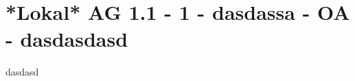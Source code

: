 \section{*Lokal* AG 1.1 - 1 - dasdassa - OA - dasdasdasd}

\begin{beispiel}[AG 1.1]{1}
dasdasd
\end{beispiel}